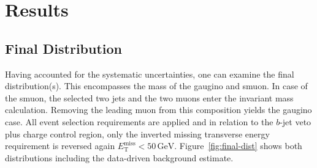 \chapter{Results}
\label{cha:results}

\section{Final Distribution}
\label{sec:final-dist}

Having accounted for the systematic uncertainties, one can examine the final distribution(s). This encompasses the mass of the gaugino and smuon. In case of the smuon, the selected two jets and the two muons enter the invariant mass calculation. Removing the leading muon from this composition yields the gaugino case. All event selection requirements are applied and in relation to the $b$-jet veto plus charge control region, only the inverted missing transverse energy requirement is reversed again $E_{\text{T}}^{\text{miss}} < 50\,\text{GeV}$. Figure~\ref{fig:final-dist} shows both distributions including the data-driven background estimate.

